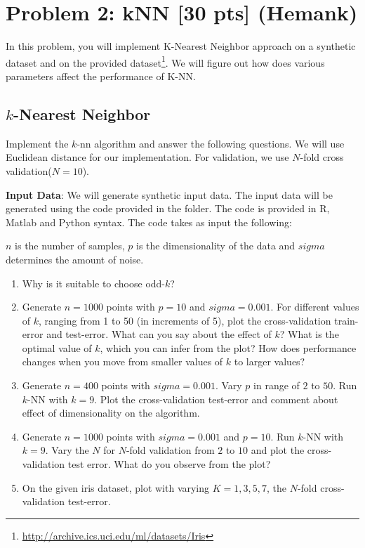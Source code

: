 \section*{Problem 2: kNN [30 pts] (Hemank)}

In this problem, you will implement K-Nearest Neighbor approach on a synthetic dataset and on the provided dataset\footnote{\url{http://archive.ics.uci.edu/ml/datasets/Iris}}. We will figure out how does various parameters affect the performance of K-NN.

\subsection*{$k$-Nearest Neighbor}
Implement the $k$-nn algorithm and answer the following questions. We will use Euclidean distance for our implementation. For validation, we use $N$-fold cross validation($N=10$). 

\textbf{Input Data}: We will generate synthetic input data. The input data will be generated using the code provided in the folder. The code is provided in R, Matlab and Python syntax. The code takes as input the following:

$n$ is the number of samples, $p$ is the dimensionality of the data and $sigma$ determines the amount of noise.

\begin{enumerate}
\item{Why is it suitable to choose odd-$k$?}

\item{Generate $n=1000$ points with $p=10$ and $sigma=0.001$. For different values of $k$, ranging from 1 to 50 (in increments of 5), plot the cross-validation train-error and test-error. What can you say about the effect of $k$? What is the optimal value of $k$, which you can infer from the plot? How does performance changes when you move from smaller values of $k$ to larger values?}

\item{Generate $n=400$ points with $sigma=0.001$. Vary $p$ in range of $2$ to $50$. Run $k$-NN with $k=9$. Plot the cross-validation test-error and comment about effect of dimensionality on the algorithm.}

\item{Generate $n=1000$ points with $sigma=0.001$ and $p=10$. Run $k$-NN with $k=9$. Vary the $N$ for $N$-fold validation from $2$ to $10$ and plot the cross-validation test error. What do you observe from the plot?}

\item{On the given iris dataset, plot with varying $K=1,3,5,7$, the $N$-fold cross-validation test-error.}

\end{enumerate}
\newpage